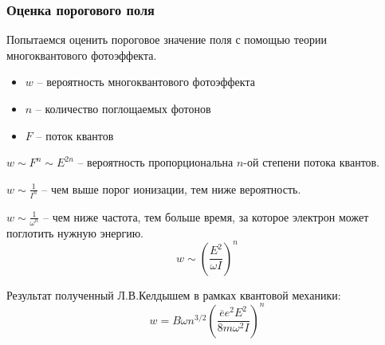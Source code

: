 \documentclass{beamer}
\begin{document}
	\begin{frame}
		\frametitle{Оценка порогового поля}
		Попытаемся оценить пороговое значение поля с помощью теории многоквантового фотоэффекта.
		\begin{itemize}
			\setlength\itemsep{-2pt}
			\item $w$ -- вероятность многоквантового фотоэффекта
			\item $n$ -- количество поглощаемых фотонов
			\item $F$ -- поток квантов
		\end{itemize}
		
		$w \sim F^n \sim E^{2n}$ -- вероятность пропорциональна $n$-ой степени потока квантов.
		
		$w \sim \frac{1}{I^n}$ -- чем выше порог ионизации, тем ниже вероятность.
		
		$w \sim \frac{1}{\omega^n}$ -- чем ниже частота, тем больше время, за которое электрон может поглотить нужную энергию.
		$$ w \sim \left(\frac{E^2}{\omega I}\right)^n$$
		
		Результат полученный Л.В.Келдышем в рамках квантовой механики:
		\begin{equation}
			w = B \omega n^{3/2} \left(\frac{\overline{e} e^2 E^2}{8m \omega^2 I}\right)^n
		\end{equation}
		
		
	\end{frame}
	
\end{document}
